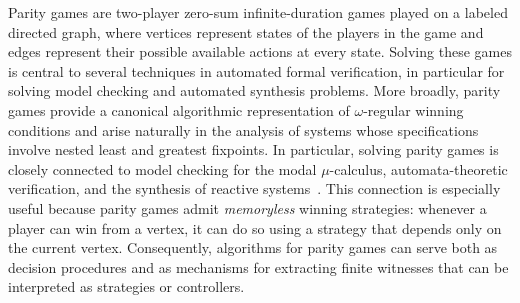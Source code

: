 \documentclass[a4paper,fleqn]{cas-sc}
\begin{document}



Parity games are two-player zero-sum infinite-duration games played on a labeled directed graph, where vertices represent states of the players in the game and edges represent their possible available actions at every state. 
Solving these games is central to several techniques in automated formal verification, in particular for solving model checking and automated synthesis problems.
%
More broadly, parity games provide a canonical algorithmic representation of
$\omega$-regular winning conditions and arise naturally in the analysis of
systems whose specifications involve nested least and greatest fixpoints.
In particular, solving parity games is closely connected to model checking
for the modal $\mu$-calculus, automata-theoretic verification, and the
synthesis of reactive systems~\citep{vanDijk:2018,Zielonka:1998,Luttenberger:2020}.
This connection is especially useful because parity games admit
\emph{memoryless} winning strategies: whenever a player can win from a
vertex, it can do so using a strategy that depends only on the current
vertex. Consequently, algorithms for parity games can serve both as decision
procedures and as mechanisms for extracting finite witnesses that can be
interpreted as strategies or controllers.
\end{document}
